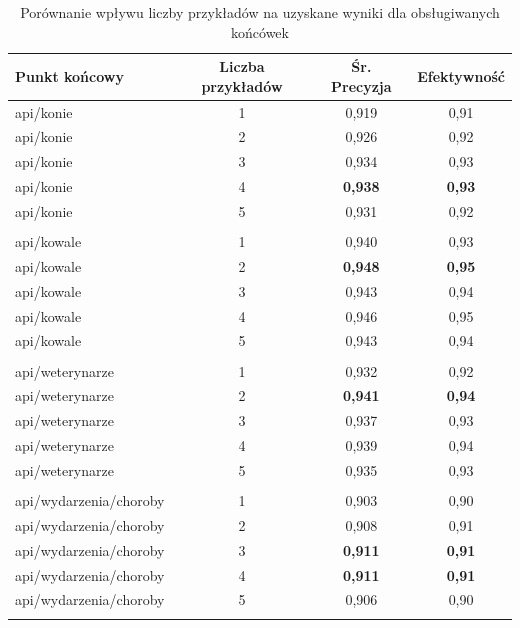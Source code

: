 \begin{table}[H]
\centering
\caption{Porównanie wpływu liczby przykładów na uzyskane wyniki dla obsługiwanych końcówek}
\label{tab:fewshot_endpoint}
\begin{tabular}{|l|c|c|c|}
\hline
\textbf{Punkt końcowy} & \textbf{Liczba przykładów} & \textbf{Śr. Precyzja} & \textbf{Efektywność} \\ \hline


api/konie & 1 & 0,919 & 0,91 \\ \hline
api/konie & 2 & 0,926 & 0,92 \\ \hline
api/konie & 3 & 0,934 & 0,93 \\ \hline
api/konie & 4 & \textbf{0,938} & \textbf{0,93} \\ \hline
api/konie & 5 & 0,931 & 0,92 \\ \hline
\multicolumn{4}{c}{} \\ \hline


api/kowale & 1 & 0,940 & 0,93 \\ \hline
api/kowale & 2 & \textbf{0,948} & \textbf{0,95} \\ \hline
api/kowale & 3 & 0,943 & 0,94 \\ \hline
api/kowale & 4 & 0,946 & 0,95 \\ \hline
api/kowale & 5 & 0,943 & 0,94 \\ \hline
\multicolumn{4}{c}{} \\ \hline


api/weterynarze & 1 & 0,932 & 0,92 \\ \hline
api/weterynarze & 2 & \textbf{0,941} & \textbf{0,94} \\ \hline
api/weterynarze & 3 & 0,937 & 0,93 \\ \hline
api/weterynarze & 4 & 0,939 & 0,94 \\ \hline
api/weterynarze & 5 & 0,935 & 0,93 \\ \hline
\multicolumn{4}{c}{} \\ \hline


api/wydarzenia/choroby & 1 & 0,903 & 0,90 \\ \hline
api/wydarzenia/choroby & 2 & 0,908 & 0,91 \\ \hline
api/wydarzenia/choroby & 3 & \textbf{0,911} & \textbf{0,91} \\ \hline
api/wydarzenia/choroby & 4 & \textbf{0,911} & \textbf{0,91} \\ \hline
api/wydarzenia/choroby & 5 & 0,906 & 0,90 \\ \hline
\multicolumn{4}{c}{} \\ \hline



\end{tabular}
\end{table}
